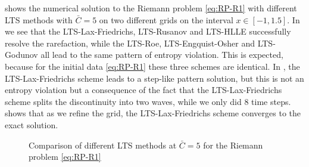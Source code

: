  shows the numerical solution to the Riemann problem \eqref{eq:RP-R1} with different LTS methods with $ \bar{C}=5 $ on two different grids on the interval $ x \in [-1,1.5] $. In  we see that the LTS-Lax-Friedrichs, LTS-Rusanov and LTS-HLLE successfully resolve the rarefaction, while the LTS-Roe, LTS-Engquist-Osher and LTS-Godunov all lead to the same pattern of entropy violation. This is expected, because for the initial data \eqref{eq:RP-R1} these three schemes are identical. In , the LTS-Lax-Friedrichs scheme leads to a step-like pattern solution, but this is not an entropy violation but a consequence of the fact that the LTS-Lax-Friedrichs scheme splits the discontinuity into two waves, while we only did 8 time steps.  shows that as we refine the grid, the LTS-Lax-Friedrichs scheme converges to the exact solution.
\begin{figure}[h!]
	\centering	

	\hspace{0.005\textwidth}
	
	\captionsetup{justification=centering}
	
	\caption{Comparison of different LTS methods at $ \bar{C}=5 $ for the Riemann problem \eqref{eq:RP-R1}}
	\label{fig:R1}

\end{figure} 


